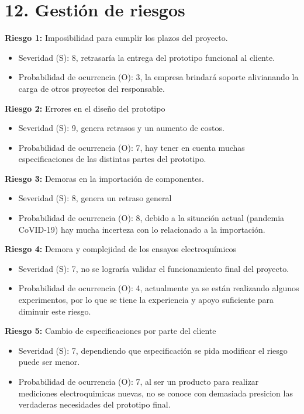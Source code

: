 \documentclass[11pt]{charter}
\begin{document}
\section{12. Gestión de riesgos}
\label{sec:riesgos}

\textbf{Riesgo 1:} Imposibilidad para cumplir los plazos del proyecto.
\begin{itemize}
\item Severidad (S): 8, retrasaría la entrega del prototipo funcional al cliente.
\item Probabilidad de ocurrencia (O): 3, la empresa brindará soporte alivianando la carga de otros proyectos del responsable.
\end{itemize}

\textbf{Riesgo 2:} Errores en el diseño del prototipo
\begin{itemize}
\item Severidad (S): 9, genera retrasos y un aumento de costos.
\item Probabilidad de ocurrencia (O): 7, hay tener en cuenta muchas especificaciones de las distintas partes del prototipo.
\end{itemize}

\textbf{Riesgo 3:} Demoras en la importación de componentes.
\begin{itemize}
\item Severidad (S): 8, genera un retraso general 
\item Probabilidad de ocurrencia (O): 8, debido a la situación actual (pandemia CoVID-19) hay mucha incerteza con lo relacionado a la importación.
\end{itemize}

\textbf{Riesgo 4:} Demora y complejidad de los ensayos electroquímicos
\begin{itemize}
\item Severidad (S): 7, no se lograría validar el funcionamiento final del proyecto.
\item Probabilidad de ocurrencia (O): 4, actualmente ya se están realizando algunos experimentos, por lo que se tiene la experiencia y apoyo suficiente para diminuir este riesgo.
\end{itemize}

\textbf{Riesgo 5:} Cambio de especificaciones por parte del cliente
\begin{itemize}
\item Severidad (S): 7, dependiendo que especificación se pida modificar el riesgo puede ser menor.
\item Probabilidad de ocurrencia (O): 7, al ser un producto para realizar mediciones electroquimicas nuevas, no se conoce con demasiada presicion las verdaderas necesidades del prototipo final.
\end{itemize}
\end{document}

